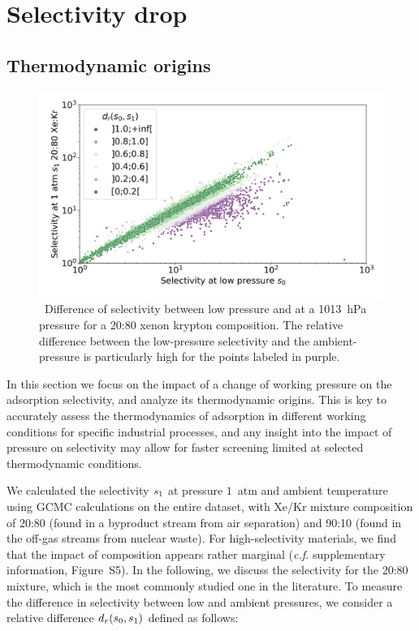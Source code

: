 \documentclass[main]{subfiles}
\begin{document}
\section{Selectivity drop}

\subsection{Thermodynamic origins}\label{section:pressure}

\begin{figure}[t]
  \centering
    \includegraphics[width=\linewidth]{figures/2-thermo/s_0_vs_s_2080_overview_log.jpg}
    \caption{\ Difference of selectivity between low pressure and at a \SI{1013}{\hecto\pascal} pressure for a 20:80 xenon krypton composition. The relative difference between the low-pressure selectivity and the ambient-pressure is particularly high for the points labeled in purple.}
    \label{fgr:overview}
  \end{figure}
  
  In this section we focus on the impact of a change of working pressure on the adsorption selectivity, and analyze its thermodynamic origins. This is key to accurately assess the thermodynamics of adsorption in different working conditions for specific industrial processes, and any insight into the impact of pressure on selectivity may allow for faster screening limited at selected thermodynamic conditions.
  
  We calculated the selectivity $s_{\text{1}}$ at pressure $1$~atm and ambient temperature using GCMC calculations on the entire dataset, with Xe/Kr mixture composition of 20:80 (found in a byproduct stream from air separation\cite{kerry2007industrial}) and 90:10 (found in the off-gas streams from nuclear waste\cite{auerbach2003handbook}). For high-selectivity materials, we find that the impact of composition appears rather marginal (\emph{c.f.} supplementary information, Figure~S5). In the following, we discuss the selectivity for the 20:80 mixture, which is the most commonly studied one in the literature. To measure the difference in selectivity between low and ambient pressures, we consider a relative difference $d_r(s_{\text{0}},s_{\text{1}})$ defined as follows:
  
\end{document}
